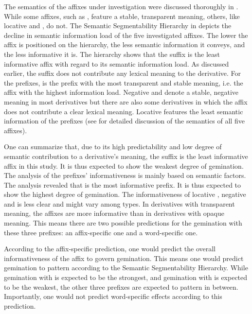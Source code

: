 {The semantics of the affixes under investigation were discussed thoroughly in . While some affixes, such as , feature a stable, transparent meaning, others, like locative  and , do not. The Semantic Segmentability Hierarchy in  depicts the decline in semantic information load of the five investigated affixes.
 The lower the affix is positioned on the hierarchy, the less semantic information it conveys, and the less informative it is. The hierarchy shows that the suffix  is the least informative affix with regard to its semantic information load.  As discussed earlier, the suffix does not contribute any lexical meaning to the derivative. 
 For the prefixes,  is the prefix with the most transparent and stable meaning, i.e. the affix with the highest information load. Negative  and  denote a stable, negative meaning in most derivatives but there are also some derivatives in which the affix does not contribute a clear lexical meaning. Locative  features the least semantic information of the prefixes (see  for detailed discussion of the semantics of all five affixes). 

One can summarize that, due to its high predictability and low degree of semantic contribution to a derivative's meaning, the suffix  is the least informative affix in this study. It is thus expected to show the weakest degree of gemination. 
The analysis of the prefixes' informativeness is mainly based on semantic factors. 
The analysis revealed that  is the most informative prefix. It is thus expected to show the highest degree of gemination. 
The informativeness of locative , negative  and  is less clear and might vary among types. In derivatives with transparent meaning, the affixes are more informative than in derivatives with opaque meaning. This means there are two possible predictions for the gemination with these three prefixes: an affix-specific one and a word-specific one. 

According to the affix-specific prediction, one would predict the overall informativeness of the affix to govern gemination. This means one would predict gemination to pattern according to the Semantic Segmentability Hierarchy. While gemination with  is expected to be the strongest, and gemination with  is expected to be the weakest, the other three prefixes are expected to pattern in between. Importantly, one would not predict word-specific effects according to this prediction. 

}

